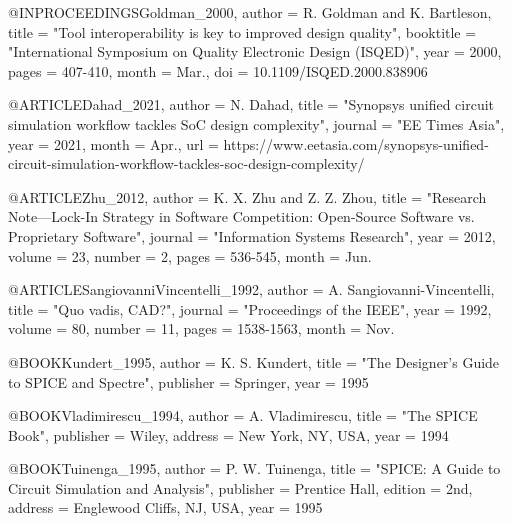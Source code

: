 \documentclass[conference]{IEEEtran}
\begin{document}
\begin{thebibliography}
@INPROCEEDINGS{Goldman_2000,
    author      =   {R. {Goldman} and K. {Bartleson}},
    title       =   "{Tool interoperability is key to improved design quality}",
    booktitle   =   "{International Symposium on Quality Electronic Design (ISQED)}",
    year        =   {2000},
    pages       =   {407-410},
    month       =   {Mar.},
    doi         =   {10.1109/ISQED.2000.838906}
}

@ARTICLE{Dahad_2021,
    author      =   {N. {Dahad}},
    title       =   "{Synopsys unified circuit simulation workflow tackles {SoC} design complexity}",
    journal     =   "{EE Times Asia}",
    year        =   {2021},
    month       =   {Apr.},
    url         =   {https://www.eetasia.com/synopsys-unified-circuit-simulation-workflow-tackles-soc-design-complexity/}
}

@ARTICLE{Zhu_2012,
    author      =   {K. X. {Zhu} and Z. Z. {Zhou}},
    title       =   "{Research Note---Lock-In Strategy in Software Competition: Open-Source Software vs. Proprietary Software}",
    journal     =   "{Information Systems Research}",
    year        =   {2012},
    volume      =   {23},
    number      =   {2},
    pages       =   {536-545},
    month       =   {Jun.}
}

@ARTICLE{SangiovanniVincentelli_1992,
    author      =   {A. {Sangiovanni-Vincentelli}},
    title       =   "{Quo vadis, {CAD}?}",
    journal     =   "{Proceedings of the IEEE}",
    year        =   {1992},
    volume      =   {80},
    number      =   {11},
    pages       =   {1538-1563},
    month       =   {Nov.}
}


@BOOK{Kundert_1995,
    author      =   {K. S. {Kundert}},
    title       =   "{The Designer's Guide to {SPICE} and Spectre}",
    publisher   =   {Springer},
    year        =   {1995}
}

@BOOK{Vladimirescu_1994,
    author      =   {A. {Vladimirescu}},
    title       =   "{The {SPICE} Book}",
    publisher   =   {Wiley},
    address     =   {New York, NY, USA},
    year        =   {1994}
}

@BOOK{Tuinenga_1995,
    author      =   {P. W. {Tuinenga}},
    title       =   "{SPICE: A Guide to Circuit Simulation and Analysis}",
    publisher   =   {Prentice Hall},
    edition     =   {2nd},
    address     =   {Englewood Cliffs, NJ, USA},
    year        =   {1995}
}


\end{thebibliography}
\end{document}
